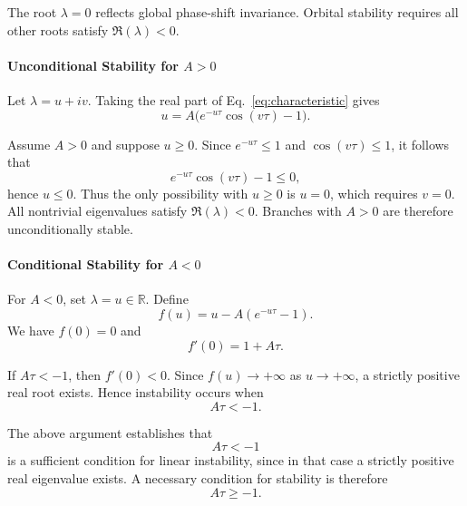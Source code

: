 \documentclass[pdflatex,sn-mathphys-num]{sn-jnl}
\begin{document}
            The root $\lambda=0$ reflects global phase-shift invariance.
            Orbital stability requires all other roots satisfy $\Re(\lambda)<0$.

        \paragraph{Unconditional Stability for \texorpdfstring{$A>0$}{A>0}}

            Let $\lambda=u+iv$.
            Taking the real part of Eq.~\ref{eq:characteristic} gives
            \begin{equation}
                u=A\big(e^{-u\tau}\cos(v\tau)-1\big).
                \label{eq:real_part}
            \end{equation}

            Assume $A>0$ and suppose $u\ge0$.
            Since $e^{-u\tau}\le1$ and $\cos(v\tau)\le1$, it follows that
            \[
                e^{-u\tau}\cos(v\tau)-1 \le 0,
            \]
            hence $u\le0$.
            Thus the only possibility with $u\ge0$ is $u=0$, which requires $v=0$.
            All nontrivial eigenvalues satisfy $\Re(\lambda)<0$.
            Branches with $A>0$ are therefore unconditionally stable.

        \paragraph{Conditional Stability for \texorpdfstring{$A<0$}{A<0}}

            For $A<0$, set $\lambda=u\in\mathbb{R}$.
            Define
            \[
                f(u)=u-A(e^{-u\tau}-1).
            \]
            We have $f(0)=0$ and
            \[
                f'(0)=1+A\tau.
            \]

            If $A\tau<-1$, then $f'(0)<0$.
            Since $f(u)\to+\infty$ as $u\to+\infty$, a strictly positive real root exists.
            Hence instability occurs when
            \begin{equation}
                A\tau<-1.
                \label{eq:stability_window}
            \end{equation}

            The above argument establishes that
            \begin{equation}
                A\tau<-1
            \end{equation}
            is a sufficient condition for linear instability, since in that case a strictly positive real eigenvalue exists.
            A necessary condition for stability is therefore
            \begin{equation}
                A\tau\ge -1.
            \end{equation}
\end{document}

